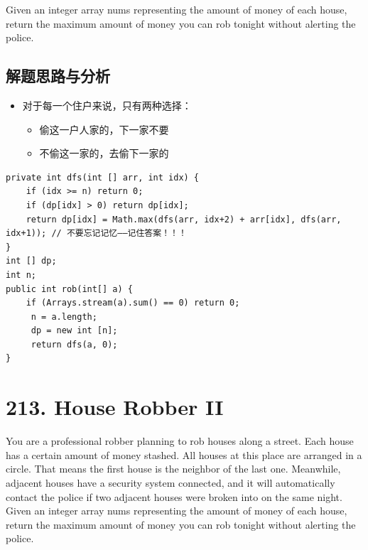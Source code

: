 \documentclass[9pt, b5paaper]{book}
\begin{document}
Given an integer array nums representing the amount of money of each house, return the maximum amount of money you can rob tonight without alerting the police.
\subsection{解题思路与分析}
\label{sec-2-2-1}
\begin{itemize}
\item 对于每一个住户来说，只有两种选择：
\begin{itemize}
\item 偷这一户人家的，下一家不要
\item 不偷这一家的，去偷下一家的
\end{itemize}
\end{itemize}
\begin{verbatim}
private int dfs(int [] arr, int idx) {
    if (idx >= n) return 0;
    if (dp[idx] > 0) return dp[idx];
    return dp[idx] = Math.max(dfs(arr, idx+2) + arr[idx], dfs(arr, idx+1)); // 不要忘记记忆——记住答案！！！
}
int [] dp;
int n;
public int rob(int[] a) {
    if (Arrays.stream(a).sum() == 0) return 0;
     n = a.length;
     dp = new int [n];
     return dfs(a, 0);
}
\end{verbatim}
\section{213. House Robber II}
\label{sec-2-3}
You are a professional robber planning to rob houses along a street. Each house has a certain amount of money stashed. All houses at this place are arranged in a circle. That means the first house is the neighbor of the last one. Meanwhile, adjacent houses have a security system connected, and it will automatically contact the police if two adjacent houses were broken into on the same night.
Given an integer array nums representing the amount of money of each house, return the maximum amount of money you can rob tonight without alerting the police.
\end{document}
